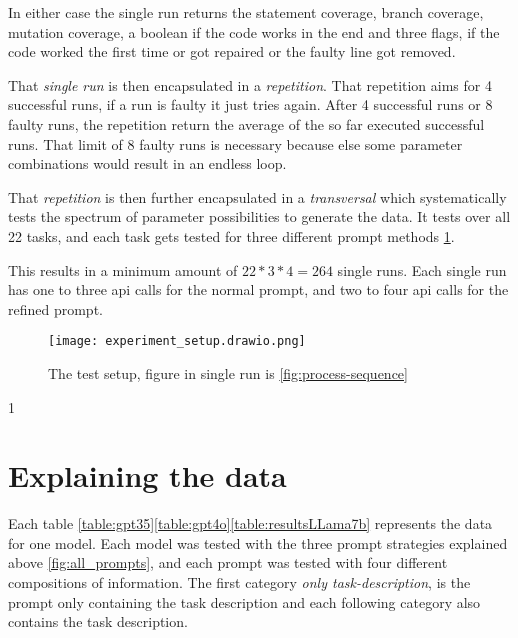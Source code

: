 \documentclass[a4paper,11pt,oneside]{memoir}
\begin{document}
In either case the single run returns the statement coverage, branch coverage, mutation coverage, a boolean if the code works in the end and three flags, if the code worked the first time or got repaired or the faulty line got removed.

That \textit{single run} is then encapsulated in a \textit{repetition}. 
That repetition aims for 4 successful runs, if a run is faulty it just tries again. After 4 successful runs or 8 faulty runs, the repetition return the average of the so far executed successful runs. That limit of 8 faulty runs is necessary because else some parameter combinations would result in an endless loop.

That \textit{repetition} is then further encapsulated in a \textit{transversal} which systematically tests the spectrum of parameter possibilities to generate the data. It tests over all 22 tasks, and each task gets tested for three different prompt methods \ref{fig:experiment-setup}.

This results in a minimum amount of $22*3*4=264$ single runs. Each single run has one to three api calls for the normal prompt, and two to four api calls for the refined prompt. 

\begin{figure}
    \centering
    \texttt{[image: experiment\_setup.drawio.png]}
    \caption{The test setup, figure in single run is \ref{fig:process-sequence}}
    \label{fig:experiment-setup}
\end{figure}

1\section{Explaining the data}
Each table \ref{table:gpt35}\ref{table:gpt4o}\ref{table:resultsLLama7b} represents the data for one model. Each model was tested with the three prompt strategies explained above \ref{fig:all_prompts}, and each prompt was tested with four different compositions of information. 
The first category \textit{only task-description}, is the prompt only containing the task description and each following category also contains the task description.
\end{document}
